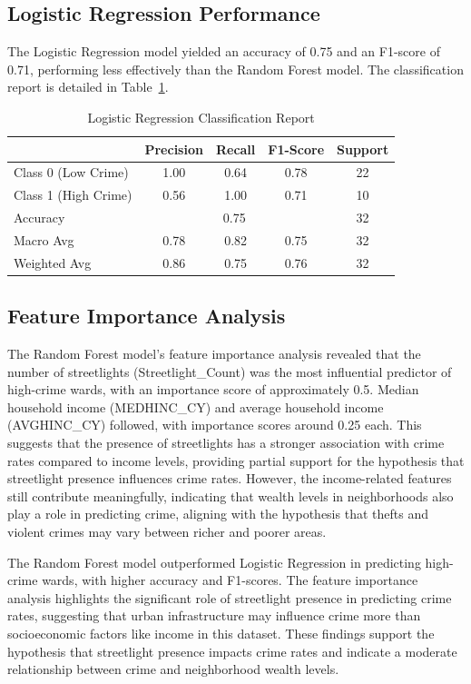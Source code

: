 \documentclass{report}
\begin{document}
\newpage
\subsection{Logistic Regression Performance}
The Logistic Regression model yielded an accuracy of 0.75 and an F1-score of 0.71, performing less effectively than the Random Forest model. The classification report is detailed in Table~\ref{tab:lr_classification_report}.

\begin{table}[htbp]
  \centering
  \caption{Logistic Regression Classification Report}
  \label{tab:lr_classification_report}
  \begin{tabular}{lcccc}
    \toprule
    & Precision & Recall & F1-Score & Support \\
    \midrule
    Class 0 (Low Crime) & 1.00 & 0.64 & 0.78 & 22 \\
    Class 1 (High Crime) & 0.56 & 1.00 & 0.71 & 10 \\
    \midrule
    Accuracy & \multicolumn{3}{c}{0.75} & 32 \\
    Macro Avg & 0.78 & 0.82 & 0.75 & 32 \\
    Weighted Avg & 0.86 & 0.75 & 0.76 & 32 \\
    \bottomrule
  \end{tabular}
\end{table}

\subsection{Feature Importance Analysis}
The Random Forest model's feature importance analysis revealed that the number of streetlights (Streetlight\_Count) was the most influential predictor of high-crime wards, with an importance score of approximately 0.5. Median household income (MEDHINC\_CY) and average household income (AVGHINC\_CY) followed, with importance scores around 0.25 each. This suggests that the presence of streetlights has a stronger association with crime rates compared to income levels, providing partial support for the hypothesis that streetlight presence influences crime rates. However, the income-related features still contribute meaningfully, indicating that wealth levels in neighborhoods also play a role in predicting crime, aligning with the hypothesis that thefts and violent crimes may vary between richer and poorer areas.
\par The Random Forest model outperformed Logistic Regression in predicting high-crime wards, with higher accuracy and F1-scores. The feature importance analysis highlights the significant role of streetlight presence in predicting crime rates, suggesting that urban infrastructure may influence crime more than socioeconomic factors like income in this dataset. These findings support the hypothesis that streetlight presence impacts crime rates and indicate a moderate relationship between crime and neighborhood wealth levels.
\end{document}
